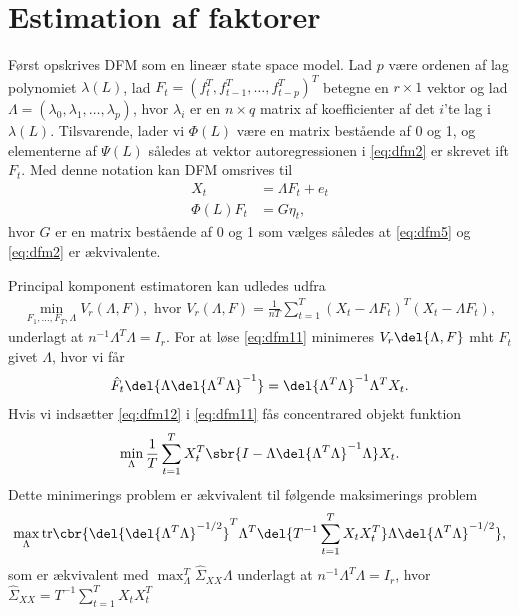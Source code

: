 \section{Estimation af faktorer}
Først opskrives DFM som en lineær state space model.
Lad $p$ være ordenen af lag polynomiet $\lambda(L)$, lad $F_t=(f_t^T,f_{t-1}^T,\ldots,f_{t-p}^T)^T$ betegne en $r \times 1$ vektor og lad $\Lambda=(\lambda_0,\lambda_1,\ldots,\lambda_p)$, hvor $\lambda_i$ er en $n \times q$ matrix af koefficienter af det $i$'te lag i $\lambda(L)$.
Tilsvarende, lader vi $\Phi(L)$ være en matrix bestående af 0 og 1, og elementerne af $\Psi(L)$ således at vektor autoregressionen i \eqref{eq:dfm2} er skrevet ift $F_t$.
Med denne notation kan DFM omsrives til
\begin{align}
X_t &= \Lambda F_t + e_t \label{eq:dfm4}\\
\Phi(L) F_t &= G \eta_t, \label{eq:dfm5}
\end{align}
hvor $G$ er en matrix bestående af 0 og 1 som vælges således at \eqref{eq:dfm5} og \eqref{eq:dfm2} er ækvivalente.

Principal komponent estimatoren kan udledes udfra 
\begin{align}
\min_{F_1,\ldots,F_T, \Lambda} V_r(\Lambda, F), \text{ hvor } V_r(\Lambda, F)=\frac{1}{nT} \sum_{t=1}^T(X_t-\Lambda F_t)^T(X_t - \Lambda F_t), \label{eq:dfm11}
\end{align}
underlagt at $n^{-1} \Lambda^T \Lambda = I_r$.
For at løse \eqref{eq:dfm11} minimeres $V_r\del{\Lambda,F}$ mht $F_t$ givet $\Lambda$, hvor vi får
\begin{align}
\hat{F}_t \del{\Lambda \del{\Lambda^T \Lambda}^{-1}}=\del{\Lambda^T \Lambda}^{-1} \Lambda^T X_t. \label{eq:dfm12}
\end{align}
Hvis vi indsætter \eqref{eq:dfm12} i \eqref{eq:dfm11} fås concentrared objekt funktion
\begin{align*}
\min_\Lambda \frac{1}{T} \sum_{t=1}^T X_t^T \sbr{I- \Lambda \del{\Lambda^T \Lambda}^{-1} \Lambda} X_t.
\end{align*}
Dette minimerings problem er ækvivalent til følgende maksimerings problem
\begin{align*}
\max_\Lambda \text{tr} \cbr{\del{\del{\Lambda^T \Lambda}^{-1/2}}^T \Lambda^T \del{T^{-1} \sum_{t=1}^T X_t X_t^T} \Lambda \del{\Lambda^T \Lambda}^{-1/2}},
\end{align*}
som er ækvivalent med $\max_\Lambda^T \hat{\Sigma}_{XX} \Lambda$ underlagt at $n^{-1} \Lambda^T \Lambda=I_r$, hvor $\hat{\Sigma}_{XX}=T^{-1} \sum_{t=1}^T X_t X_t^T$

